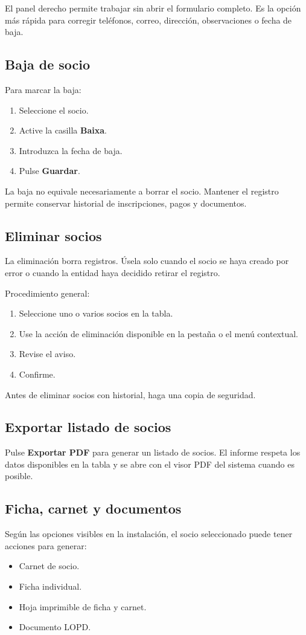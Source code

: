 \documentclass[12pt]{article}
\newcommand{\boton}[1]{\textbf{#1}}
\newcommand{\campo}[1]{\textbf{#1}}
\begin{document}
El panel derecho permite trabajar sin abrir el formulario completo. Es la opción más rápida para corregir teléfonos, correo, dirección, observaciones o fecha de baja.

\subsection{Baja de socio}
Para marcar la baja:
\begin{enumerate}
  \item Seleccione el socio.
  \item Active la casilla \campo{Baixa}.
  \item Introduzca la fecha de baja.
  \item Pulse \boton{Guardar}.
\end{enumerate}

La baja no equivale necesariamente a borrar el socio. Mantener el registro permite conservar historial de inscripciones, pagos y documentos.

\subsection{Eliminar socios}
La eliminación borra registros. Úsela solo cuando el socio se haya creado por error o cuando la entidad haya decidido retirar el registro.

Procedimiento general:
\begin{enumerate}
  \item Seleccione uno o varios socios en la tabla.
  \item Use la acción de eliminación disponible en la pestaña o el menú contextual.
  \item Revise el aviso.
  \item Confirme.
\end{enumerate}

Antes de eliminar socios con historial, haga una copia de seguridad.

\subsection{Exportar listado de socios}
Pulse \boton{Exportar PDF} para generar un listado de socios. El informe respeta los datos disponibles en la tabla y se abre con el visor PDF del sistema cuando es posible.

\subsection{Ficha, carnet y documentos}
Según las opciones visibles en la instalación, el socio seleccionado puede tener acciones para generar:
\begin{itemize}
  \item Carnet de socio.
  \item Ficha individual.
  \item Hoja imprimible de ficha y carnet.
  \item Documento LOPD.
\end{itemize}
\end{document}
